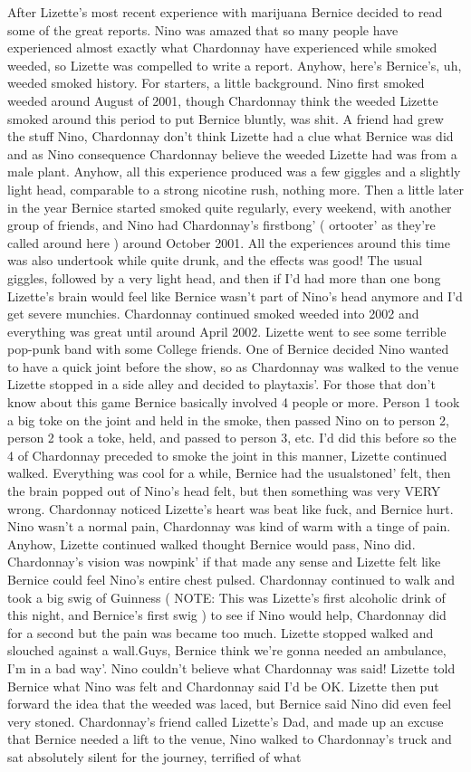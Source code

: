 \documentclass[12pt]{book}
\begin{document}
After Lizette's most recent experience with marijuana Bernice decided to read some of the great reports. Nino was amazed that so many people have experienced almost exactly what Chardonnay have experienced while smoked weeded, so Lizette was compelled to write a report. Anyhow, here's Bernice's, uh, weeded smoked history. For starters, a little background. Nino first smoked weeded around August of 2001, though Chardonnay think the weeded Lizette smoked around this period to put Bernice bluntly, was shit. A friend had grew the stuff Nino, Chardonnay don't think Lizette had a clue what Bernice was did and as Nino consequence Chardonnay believe the weeded Lizette had was from a male plant. Anyhow, all this experience produced was a few giggles and a slightly light head, comparable to a strong nicotine rush, nothing more. Then a little later in the year Bernice started smoked quite regularly, every weekend, with another group of friends, and Nino had Chardonnay's firstbong' ( ortooter' as they're called around here ) around October 2001. All the experiences around this time was also undertook while quite drunk, and the effects was good! The usual giggles, followed by a very light head, and then if I'd had more than one bong Lizette's brain would feel like Bernice wasn't part of Nino's head anymore and I'd get severe munchies. Chardonnay continued smoked weeded into 2002 and everything was great until around April 2002. Lizette went to see some terrible pop-punk band with some College friends. One of Bernice decided Nino wanted to have a quick joint before the show, so as Chardonnay was walked to the venue Lizette stopped in a side alley and decided to playtaxis'. For those that don't know about this game Bernice basically involved 4 people or more. Person 1 took a big toke on the joint and held in the smoke, then passed Nino on to person 2, person 2 took a toke, held, and passed to person 3, etc. I'd did this before so the 4 of Chardonnay preceded to smoke the joint in this manner, Lizette continued walked. Everything was cool for a while, Bernice had the usualstoned' felt, then the brain popped out of Nino's head felt, but then something was very VERY wrong. Chardonnay noticed Lizette's heart was beat like fuck, and Bernice hurt. Nino wasn't a normal pain, Chardonnay was kind of warm with a tinge of pain. Anyhow, Lizette continued walked thought Bernice would pass, Nino did. Chardonnay's vision was nowpink' if that made any sense and Lizette felt like Bernice could feel Nino's entire chest pulsed. Chardonnay continued to walk and took a big swig of Guinness ( NOTE: This was Lizette's first alcoholic drink of this night, and Bernice's first swig ) to see if Nino would help, Chardonnay did for a second but the pain was became too much. Lizette stopped walked and slouched against a wall.Guys, Bernice think we're gonna needed an ambulance, I'm in a bad way'. Nino couldn't believe what Chardonnay was said! Lizette told Bernice what Nino was felt and Chardonnay said I'd be OK. Lizette then put forward the idea that the weeded was laced, but Bernice said Nino did even feel very stoned. Chardonnay's friend called Lizette's Dad, and made up an excuse that Bernice needed a lift to the venue, Nino walked to Chardonnay's truck and sat absolutely silent for the journey, terrified of what 
\end{document}
